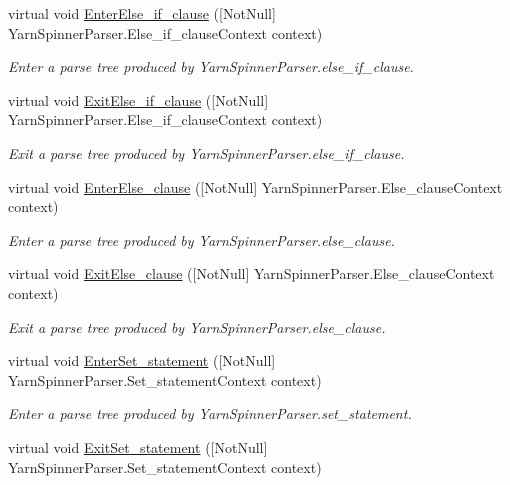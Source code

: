 \begin{DoxyCompactItemize}
virtual void \hyperlink{a00196_a453eb5ea8f6e44280ab156b771821919}{Enter\-Else\-\_\-if\-\_\-clause} (\mbox{[}Not\-Null\mbox{]} Yarn\-Spinner\-Parser.\-Else\-\_\-if\-\_\-clause\-Context context)
\begin{DoxyCompactList}\small\item\em Enter a parse tree produced by Yarn\-Spinner\-Parser.\-else\-\_\-if\-\_\-clause. \end{DoxyCompactList}\item 
virtual void \hyperlink{a00196_a071da0b364f87cb542e2e3dff5d9f9c4}{Exit\-Else\-\_\-if\-\_\-clause} (\mbox{[}Not\-Null\mbox{]} Yarn\-Spinner\-Parser.\-Else\-\_\-if\-\_\-clause\-Context context)
\begin{DoxyCompactList}\small\item\em Exit a parse tree produced by Yarn\-Spinner\-Parser.\-else\-\_\-if\-\_\-clause. \end{DoxyCompactList}\item 
virtual void \hyperlink{a00196_a571719b5e04b3e980ab2a05cd2c44989}{Enter\-Else\-\_\-clause} (\mbox{[}Not\-Null\mbox{]} Yarn\-Spinner\-Parser.\-Else\-\_\-clause\-Context context)
\begin{DoxyCompactList}\small\item\em Enter a parse tree produced by Yarn\-Spinner\-Parser.\-else\-\_\-clause. \end{DoxyCompactList}\item 
virtual void \hyperlink{a00196_a2dcc21a150bdc508c49e81bd10b6964f}{Exit\-Else\-\_\-clause} (\mbox{[}Not\-Null\mbox{]} Yarn\-Spinner\-Parser.\-Else\-\_\-clause\-Context context)
\begin{DoxyCompactList}\small\item\em Exit a parse tree produced by Yarn\-Spinner\-Parser.\-else\-\_\-clause. \end{DoxyCompactList}\item 
virtual void \hyperlink{a00196_aad83c1dbc65e88ec66978ffc6fe96a5f}{Enter\-Set\-\_\-statement} (\mbox{[}Not\-Null\mbox{]} Yarn\-Spinner\-Parser.\-Set\-\_\-statement\-Context context)
\begin{DoxyCompactList}\small\item\em Enter a parse tree produced by Yarn\-Spinner\-Parser.\-set\-\_\-statement. \end{DoxyCompactList}\item 
virtual void \hyperlink{a00196_a32a780332df7d7104f4816995e3f4970}{Exit\-Set\-\_\-statement} (\mbox{[}Not\-Null\mbox{]} Yarn\-Spinner\-Parser.\-Set\-\_\-statement\-Context context)

\end{DoxyCompactItemize}
